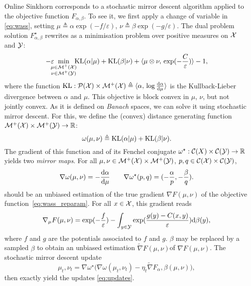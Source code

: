Online Sinkhorn corresponds to a stochastic mirror descent algorithm applied to
the objective function $F_{\alpha, \beta}$. To see it, we first apply a change
of variable in \eqref{eq:wass}, setting $\mu \triangleq \alpha \exp(-f /
\varepsilon)$, $\nu \triangleq \beta \exp(-g / \varepsilon)$. The dual problem solution 
$F_{\alpha, \beta}^\star$
rewrites as a minimisation problem over positive measures on $\mathcal{X}$ and $\mathcal{Y}$:
\begin{equation}\label{eq:wass_reparam}
    - \varepsilon \!\!\!\!\min_{\substack{\mu \in \mathcal{M}^+(\mathcal{X}) \\ 
    \nu \in \mathcal{M}^+(\mathcal{Y})}} \!\!\!\textrm{KL}(\alpha | \mu)
    + \textrm{KL}(\beta | \nu) + \langle \mu \otimes \nu,\,\exp(-\frac{C}{\varepsilon})\rangle - 1,
\end{equation}
where the function $\textrm{KL}: \mathcal{P}(\mathcal{X}) \times \mathcal{M}^+(\mathcal{X}) \triangleq \langle \alpha,\,
    \log \frac{\textrm{d} \alpha}{\textrm{d} \mu}\rangle$ is the Kullback-Lieber divergence between
$\alpha$ and $\mu$. This objective is block convex in $\mu$, $\nu$, but not jointly convex. As it is defined on \textit{Banach} spaces, we can solve it using stochastic mirror descent. For this, we define the (convex) distance generating function $\mathcal{M}^+(\mathcal{X}) \times \mathcal{M}^+(\mathcal{Y}) \to \mathbb{R}$:
\begin{equation}
    \omega(\mu, \nu) \triangleq \textrm{KL}(\alpha | \mu) + \textrm{KL}(\beta | \nu).
\end{equation}
The gradient of this function and of its Fenchel conjugate $\omega^\star: \mathcal{C}(X)
\times \mathcal{C}(\mathcal{Y}) \to \mathbb{R}$ yields two \textit{mirror maps}. For all $\mu, \nu \in
\mathcal{M}^+(\mathcal{X}) \times \mathcal{M}^+(\mathcal{Y})$, $p, q \in \mathcal{C}(\mathcal{X}) \times \mathcal{C}(\mathcal{Y})$,
\begin{equation}
    \nabla \omega(\mu, \nu) = - \frac{\textrm{d} \alpha}{\textrm{d} \mu}
    \qquad \nabla \omega^\star(p, q) = (-\frac{\alpha}{p}, -\frac{\beta}{q}).
\end{equation}
 should be an unbiased estimation
of the true gradient $\nabla F(\mu, \nu)$ of the objective function~\eqref{eq:wass_reparam}.
For all $x \in \mathcal{X}$, this gradient reads
\begin{equation}
    \nabla_\mu F(\mu, \nu) = \exp(-\frac{f}{\varepsilon}) - 
    \int_{y \in \mathcal{Y}} \exp(\frac{g(y) - C(x, y)}{\varepsilon})\textrm{d} \beta(y),
\end{equation}
where $f$ and $g$ are the potentials associated to $f$ and $g$. $\beta$ may be
replaced by a sampled $\beta$ to obtain an unbiased estimation $\tilde \nabla
F(\mu, \nu)$of $\nabla F(\mu, \nu)$. The stochastic mirror descent update
% 
\begin{equation}
    \mu_t, \nu_t = \nabla \omega^\star\Big( \nabla \omega(\mu_t, \nu_t) - 
    \eta_t \tilde \nabla F_\alpha, \beta(\mu, \nu)\Big),
\end{equation}
then exactly yield the updates \eqref{eq:updates}. 

